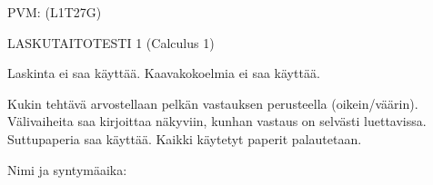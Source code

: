 \documentclass[finnish, a4paper, 12pt]{article}
\begin{document}
	
	
		PVM: \underline{\phantom{mm.mm.}}
		\hfill
		(L1T27G)	%
	
	\begin{center}
		{\large
			LASKUTAITOTESTI 1 (Calculus 1)}
	\end{center}
	
	Laskinta ei saa käyttää. Kaavakokoelmia ei saa käyttää.
	
	Kukin tehtävä arvostellaan pelkän vastauksen perusteella (oikein/väärin).
	Välivaiheita saa kirjoittaa näkyviin, kunhan vastaus on selvästi luettavissa.
	Suttupaperia saa käyttää. Kaikki käytetyt paperit palautetaan.
	
\vspace{12pt}
Nimi ja syntymäaika: \phantom{m} \hrulefill
\vspace{8pt}
	
\end{document}
